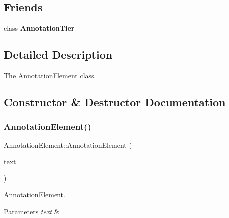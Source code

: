 \subsection*{Friends}
\begin{DoxyCompactItemize}
\item 
\mbox{\label{class_annotation_element_a2a64bb821e0fcc1c90c808ce5a2eb6ef}} 
class {\bfseries Annotation\+Tier}
\end{DoxyCompactItemize}


\subsection{Detailed Description}
The \hyperlink{class_annotation_element}{Annotation\+Element} class. 

\subsection{Constructor \& Destructor Documentation}
\mbox{\label{class_annotation_element_a77b837f3d7eb7d450b1aca83765a488f}} 
\subsubsection{\texorpdfstring{Annotation\+Element()}{AnnotationElement()}\hspace{0.1cm}{\footnotesize\ttfamily [1/3]}}
{\footnotesize\ttfamily Annotation\+Element\+::\+Annotation\+Element (\begin{DoxyParamCaption}\item[{const Q\+String \&}]{text }\end{DoxyParamCaption})\hspace{0.3cm}{\ttfamily [explicit]}}



\hyperlink{class_annotation_element}{Annotation\+Element}. 


\begin{DoxyParams}{Parameters}
{\em text} & \\
\hline
\end{DoxyParams}
\mbox{\label{class_annotation_element_a12c2571e880beacafbceadb16b6bd0bb}} 
